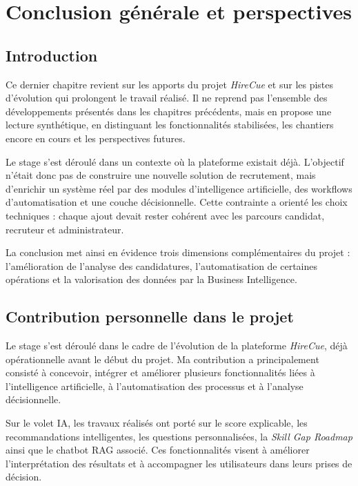 \chapter{Conclusion générale et perspectives}

\section*{Introduction}

Ce dernier chapitre revient sur les apports du projet \textit{HireCue} et sur les pistes d'évolution qui prolongent le travail réalisé. Il ne reprend pas l'ensemble des développements présentés dans les chapitres précédents, mais en propose une lecture synthétique, en distinguant les fonctionnalités stabilisées, les chantiers encore en cours et les perspectives futures.

Le stage s'est déroulé dans un contexte où la plateforme existait déjà. L'objectif n'était donc pas de construire une nouvelle solution de recrutement, mais d'enrichir un système réel par des modules d'intelligence artificielle, des workflows d'automatisation et une couche décisionnelle. Cette contrainte a orienté les choix techniques : chaque ajout devait rester cohérent avec les parcours candidat, recruteur et administrateur.

La conclusion met ainsi en évidence trois dimensions complémentaires du projet : l'amélioration de l'analyse des candidatures, l'automatisation de certaines opérations et la valorisation des données par la Business Intelligence.

\section{Contribution personnelle dans le projet}

Le stage s'est déroulé dans le cadre de l'évolution de la plateforme \textit{HireCue}, déjà opérationnelle avant le début du projet. Ma contribution a principalement consisté à concevoir, intégrer et améliorer plusieurs fonctionnalités liées à l'intelligence artificielle, à l'automatisation des processus et à l'analyse décisionnelle.

Sur le volet IA, les travaux réalisés ont porté sur le score explicable, les recommandations intelligentes, les questions personnalisées, la \textit{Skill Gap Roadmap} ainsi que le chatbot RAG associé. Ces fonctionnalités visent à améliorer l'interprétation des résultats et à accompagner les utilisateurs dans leurs prises de décision.

